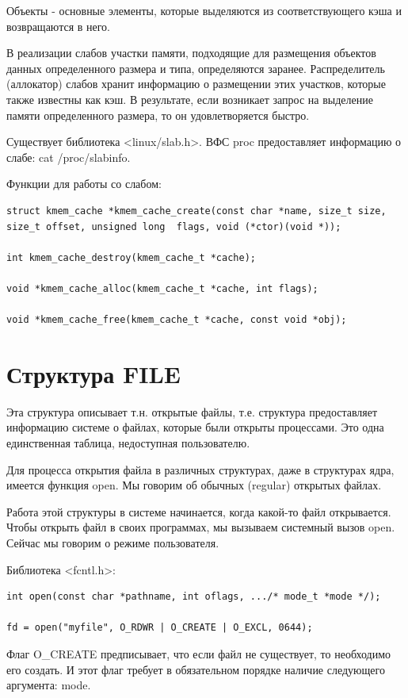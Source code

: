 \documentclass[12pt,a4paper]{scrreprt}
\begin{document}
Объекты - основные элементы, которые выделяются из соответствующего кэша и возвращаются в него.

В реализации слабов участки памяти, подходящие для размещения объектов данных определенного размера и типа, определяются заранее. Распределитель (аллокатор) слабов хранит информацию о размещении этих участков, которые также известны как кэш. В результате, если возникает запрос на выделение памяти определенного размера, то он удовлетворяется быстро.

Существует библиотека <linux/slab.h>. ВФС proc предоставляет информацию о слабе: cat /proc/slabinfo.

Функции для работы со слабом:

\begin{lstlisting}
struct kmem_cache *kmem_cache_create(const char *name, size_t size, size_t offset, unsigned long  flags, void (*ctor)(void *));

int kmem_cache_destroy(kmem_cache_t *cache);

void *kmem_cache_alloc(kmem_cache_t *cache, int flags);

void *kmem_cache_free(kmem_cache_t *cache, const void *obj);
\end{lstlisting}

\section{Структура FILE}

Эта структура описывает т.н. открытые файлы, т.е. структура предоставляет информацию системе о файлах, которые были открыты процессами. Это одна единственная таблица, недоступная пользователю.

Для процесса открытия файла в различных структурах, даже в структурах ядра, имеется функция open. Мы говорим об обычных (regular) открытых файлах.

Работа этой структуры в системе начинается, когда какой-то файл открывается. Чтобы открыть файл в своих программах, мы вызываем системный вызов open. Сейчас мы говорим о режиме пользователя.

Библиотека <fcntl.h>:

\begin{lstlisting}
int open(const char *pathname, int oflags, .../* mode_t *mode */);

fd = open("myfile", O_RDWR | O_CREATE | O_EXCL, 0644);
\end{lstlisting}

Флаг O\_CREATE предписывает, что если файл не существует, то необходимо его создать. И этот флаг требует в обязательном порядке наличие следующего аргумента: mode.
\end{document}
